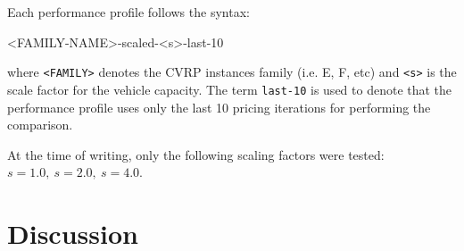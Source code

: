 
Each performance profile follows the syntax:
\begin{center}
	\begin{LVerbatim}
		<FAMILY-NAME>-scaled-<s>-last-10
	\end{LVerbatim}
\end{center}
where \texttt{<FAMILY>} denotes the CVRP instances family (i.e. E, F, etc) and \texttt{<s>} is the scale factor for the vehicle capacity.
The term \texttt{last-10} is used to denote that the performance profile uses only the last 10 pricing iterations for performing the comparison.

At the time of writing, only the following scaling factors were tested: $s = 1.0,\ s = 2.0,\ s = 4.0$.

\section{Discussion}
\label{sec:results-discussion}


\begin{comment}
\mytodo{Include the F-n135 grep result to talk about the difficulty of this instance and related ones}
\end{comment}
